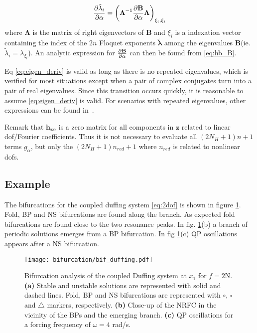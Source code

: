 \begin{equation}
  \label{eq:eigen_deriv}
  \frac{\p \tilde{\lambda}_i}{\p \alpha} =
  \left( \bm \Lambda^{-1} \frac{\p \bm B}{\p \alpha} \bm \Lambda \right)_{\xi_i, \xi_i}
\end{equation}
where $\bm \Lambda$ is the matrix of right eigenvectors of $\bm B$ and $\xi_i$
is a indexation vector containing the index of the $2n$ Floquet exponents
$\tilde{\bm \lambda}$ among the eigenvalues $\bm B$(ie.
$\tilde{\lambda}_i=\lambda_{\xi_i}$).
An analytic expression for $\frac{\p \bm B}{\p \alpha}$ can then be found from
\eqref{eq:hb_B}.

Eq \eqref{eq:eigen_deriv} is valid as long as there is no repeated eigenvalues,
which is verified for most situations except when a pair of complex conjugates
turn into a pair of real eigenvalues. Since this transition occurs quickly, it
is reasonable to assume \eqref{eq:eigen_deriv} is valid. For scenarios with
repeated eigenvalues, other expressions can be found in~\autocite{aa2007a}.

Remark that $\bm h_{\bm z \alpha}$ is a zero matrix for all components in $\bm
z$ related to linear dof/Fourier coefficients. Thus it is not necessary to
evaluate all $(2N_H+1)n +1$ terms $g_\alpha$, but only the $(2N_H+1)n_{red} +1$
where $n_{red}$ is related to nonlinear dofs.


\subsection{Example}
\label{sec:bif_example}

The bifurcations for the coupled duffing system \eqref{eq:2dof} is shown in
figure \ref{fig:bif_example}. Fold, BP and NS bifurcations are found along the
branch. As expected fold bifurcations are found close to the two resonance
peaks. In fig. \ref{fig:bif_example}(b) a branch of periodic solutions emerges
from a BP bifurcation. In fig \ref{fig:bif_example}(c) QP oscillations appears
after a NS bifurcation.

\begin{figure}[ht!]
  \centering
    \texttt{[image: bifurcation/bif\_duffing.pdf]}
  \caption{Bifurcation analysis of the coupled Duffing system at $x_1$ for
    $f=2$N.
    \textbf{(a)} Stable and unstable solutions are represented with solid and
    dashed lines. Fold, BP and NS bifurcations are represented with $\bm \circ$,
    $\bm \square$ and $\bm \triangle$ markers, respectively.
    \textbf{(b)} Close-up of the NRFC in the vicinity of the BPs and the
    emerging branch.
    \textbf{(c)} QP oscillations for a forcing frequency of $\omega=4$ rad/s.}
  \label{fig:bif_example}
\end{figure}

